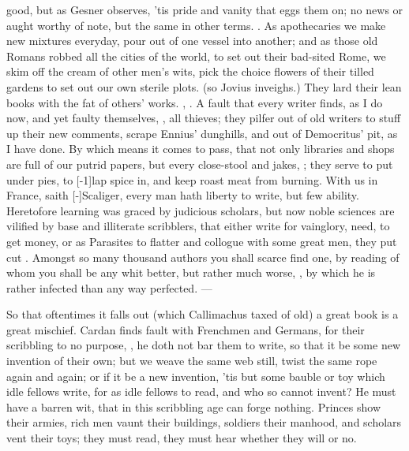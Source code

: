 {good, but as Gesner observes, 'tis pride and vanity that eggs them
on; no news or aught worthy of note, but the same in other terms. . As apothecaries we make new mixtures everyday, pour
out of one vessel into another; and as those old Romans robbed all the
cities of the world, to set out their bad-sited Rome, we skim off the
cream of other men's wits, pick the choice flowers of their tilled
gardens to set out our own sterile plots.  (so Jovius inveighs.) They
lard their lean books with the fat of others' works. ,
\etc. A fault that every writer finds, as I do now, and yet faulty
themselves, , all thieves; they pilfer out
of old writers to stuff up their new comments, scrape Ennius'
dunghills, and out of Democritus' pit, as I have done. By which
means it comes to pass, that not only libraries and shops are full
of our putrid papers, but every close-stool and jakes, ; they serve to put under pies, to [-1\baselineskip]lap spice
in, and keep roast meat from burning. With us in France, saith
[-\baselineskip]Scaliger, every man hath liberty to write, but few ability.
Heretofore learning was graced by judicious scholars, but now noble
sciences are vilified by base and illiterate scribblers, that either
write for vainglory, need, to get money, or as Parasites to flatter and
collogue with some great men, they put cut . Amongst so many thousand authors you shall scarce find
one, by reading of whom you shall be any whit better, but rather much
worse, , by which he is rather
infected than any way perfected.
---

So that oftentimes it falls out (which Callimachus taxed of old) a
great book is a great mischief. Cardan finds fault with Frenchmen
and Germans, for their scribbling to no purpose, , he doth not bar them to write,
so that it be some new invention of their own; but we weave the same
web still, twist the same rope again and again; or if it be a new
invention, 'tis but some bauble or toy which idle fellows write, for as
idle fellows to read, and who so cannot invent? He must have a
barren wit, that in this scribbling age can forge nothing. Princes
show their armies, rich men vaunt their buildings, soldiers their
manhood, and scholars vent their toys; they must read, they must hear
whether they will or no.

}
